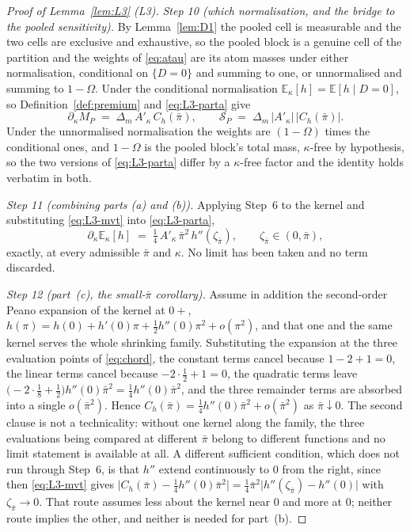 \documentclass[11pt]{article}
\newcommand{\Eop}{\mathbb{E}}
\newcommand{\Akap}{A'_{\kappa}}
\begin{document}
\begin{proof}[Proof of Lemma~\ref{lem:L3} (L3)]
\emph{Step 10 (which normalisation, and the bridge to the pooled sensitivity).} By
Lemma~\ref{lem:D1} the pooled cell is measurable and the two cells are exclusive and exhaustive, so
the pooled block is a genuine cell of the partition and the weights of \eqref{eq:atau} are its atom
masses under either normalisation, conditional on $\{D=0\}$ and summing to one, or unnormalised and
summing to $1-\Omega$. Under the conditional normalisation $\Eop_\kappa[h] = \Eop[h \mid D=0]$, so
Definition~\ref{def:premium} and \eqref{eq:L3-parta} give
\begin{equation}
\label{eq:L3-SP}
\partial_\kappa M_P \;=\; \Delta_m\,\Akap\,C_h(\bar\pi),
\qquad
\mathcal S_P \;=\; \Delta_m\,\lvert \Akap\rvert\,\lvert C_h(\bar\pi)\rvert .
\end{equation}
Under the unnormalised normalisation the weights are $(1-\Omega)$ times the conditional ones, and
$1-\Omega$ is the pooled block's total mass, $\kappa$-free by hypothesis, so the two versions of
\eqref{eq:L3-parta} differ by a $\kappa$-free factor and the identity holds verbatim in both.

\emph{Step 11 (combining parts (a) and (b)).} Applying Step~6 to the kernel and substituting
\eqref{eq:L3-mvt} into \eqref{eq:L3-parta},
\begin{equation}
\label{eq:L3-exact}
\partial_\kappa\Eop_\kappa[h] \;=\; \tfrac14\,\Akap\,\bar\pi^2\,h''(\zeta_{\bar\pi}),
\qquad \zeta_{\bar\pi} \in (0,\bar\pi),
\end{equation}
exactly, at every admissible $\bar\pi$ and $\kappa$. No limit has been taken and no term discarded.

\emph{Step 12 (part~(c), the small-$\bar\pi$ corollary).} Assume in addition the second-order Peano
expansion of the kernel at $0+$, $h(\pi) = h(0)+h'(0)\pi+\tfrac12h''(0)\pi^2+o(\pi^2)$, and that one
and the same kernel serves the whole shrinking family. Substituting the expansion at the three
evaluation points of \eqref{eq:chord}, the constant terms cancel because $1-2+1 = 0$, the linear
terms cancel because $-2\cdot\tfrac12+1 = 0$, the quadratic terms leave
$\bigl(-2\cdot\tfrac18+\tfrac12\bigr)h''(0)\bar\pi^2 = \tfrac14h''(0)\bar\pi^2$, and the three
remainder terms are absorbed into a single $o(\bar\pi^2)$. Hence
$C_h(\bar\pi) = \tfrac14h''(0)\bar\pi^2 + o(\bar\pi^2)$ as $\bar\pi \downarrow 0$. The second clause
is not a technicality: without one kernel along the family, the three evaluations being compared at
different $\bar\pi$ belong to different functions and no limit statement is available at all. A
different sufficient condition, which does not run through Step~6, is that $h''$ extend continuously
to $0$ from the right, since then \eqref{eq:L3-mvt} gives
$\bigl|C_h(\bar\pi)-\tfrac14h''(0)\bar\pi^2\bigr|
= \tfrac14\bar\pi^2\bigl|h''(\zeta_{\bar\pi})-h''(0)\bigr|$ with
$\zeta_{\bar\pi} \to 0$. That route assumes less about the kernel near $0$ and more at $0$; neither
route implies the other, and neither is needed for part~(b).


\end{proof}
\end{document}
